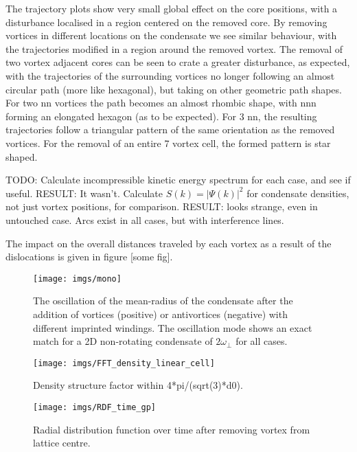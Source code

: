 The trajectory plots show very small global effect on the core positions, with a disturbance localised in a region centered on the removed
core. By removing vortices in different locations on the condensate we see similar behaviour, with the trajectories modified in a region
around the removed vortex. The removal of two vortex adjacent cores can be seen to crate a greater disturbance, as expected, with the
trajectories of the surrounding vortices no longer following an almost circular path (more like hexagonal), but taking on other geometric
path shapes. For two nn vortices the path becomes an almost rhombic shape, with nnn forming an elongated hexagon (as to be expected). For 3
nn, the resulting trajectories follow a triangular pattern of the same orientation as the removed vortices. For the removal of an entire 7
vortex cell, the formed pattern is star shaped.

TODO:
Calculate incompressible kinetic energy spectrum for each case, and see if useful. RESULT: It wasn't.
Calculate $S(k) = |\Psi(k)|^2$ for condensate densities, not just vortex positions, for comparison. RESULT: looks strange, even in untouched
case. Arcs exist in all cases, but with interference lines.

The impact on the overall distances traveled by each vortex as a result of the dislocations is given in figure [some fig].

\begin{figure}[tb]
	\texttt{[image: imgs/mono]}
	\caption{The oscillation of the mean-radius of the condensate after the addition of vortices (positive) or antivortices (negative) with
	different imprinted windings. The oscillation mode shows an exact match for a 2D non-rotating condensate of $2\omega_{\perp}$ for all cases.}
\end{figure}

\begin{figure}[tb]
	\texttt{[image: imgs/FFT\_density\_linear\_cell]}
	\caption{Density structure factor within 4*pi/(sqrt(3)*d0).}
\end{figure}


\begin{figure}[tb]
	\texttt{[image: imgs/RDF\_time\_gp]}
	\caption{Radial distribution function over time after removing vortex from lattice centre. }
\end{figure}


